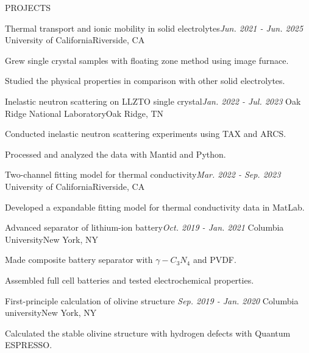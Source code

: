 \documentclass{resume} %
\begin{document}
\begin{rSection}{PROJECTS}
    
\begin{rSubsection}
    {Thermal transport and ionic mobility in solid electrolytes}{\em Jun. 2021 - Jun. 2025}
    {University of California}{Riverside, CA}
\item Grew single crystal samples with floating zone method using image furnace.
\item Studied the physical properties in comparison with other solid electrolytes.
\end{rSubsection}

\begin{rSubsection}
    {Inelastic neutron scattering on LLZTO single crystal}{\em Jan. 2022 - Jul. 2023}
    {Oak Ridge National Laboratory}{Oak Ridge, TN}
    \item Conducted inelastic neutron scattering experiments using TAX and ARCS.
    \item Processed and analyzed the data with Mantid and Python.
\end{rSubsection}

\begin{rSubsection}
    {Two-channel fitting model for thermal conductivity}{\em Mar. 2022 - Sep. 2023}
    {University of California}{Riverside, CA}
\item Developed a expandable fitting model for thermal conductivity data in MatLab.
\end{rSubsection}

\begin{rSubsection}
{Advanced separator of lithium-ion battery}{\em Oct. 2019 - Jan. 2021}
{Columbia University}{New York, NY}
 \item Made composite battery separator with $\gamma-C_3 N_4$ and PVDF.
 \item Assembled full cell batteries and tested electrochemical properties.
\end{rSubsection}


\begin{rSubsection}
{First-principle calculation of olivine structure }{\em Sep. 2019 - Jan. 2020}
{Columbia university}{New York, NY}
\item Calculated the stable olivine structure with hydrogen defects with Quantum ESPRESSO.
\end{rSubsection}



\end{rSection}
\end{document}
